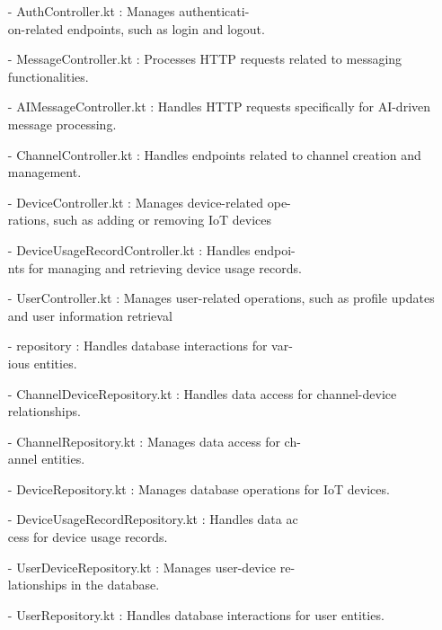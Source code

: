 \documentclass[conference]{IEEEtran}
\begin{document}
\begin{enumerate}
        \item[-] AuthController.kt : Manages authenticati-\\on-related endpoints, such as login and logout.\\
        
        \item[-] MessageController.kt : Processes HTTP requests related to messaging functionalities.\\
        
        \item[-] AIMessageController.kt : Handles HTTP requests specifically for AI-driven message processing.\\
        
        \item[-] ChannelController.kt : Handles endpoints related to channel creation and management.\\
        
        \item[-] DeviceController.kt : Manages device-related ope-\\rations, such as adding or removing IoT devices \\
        
        \item[-] DeviceUsageRecordController.kt : Handles endpoi-\\nts for managing and retrieving device usage records.\\
        
        \item[-] UserController.kt : Manages user-related operations, such as profile updates and user information retrieval\\

        \item[-] repository : Handles database interactions for var-\\ious entities.\\
        \item[-] ChannelDeviceRepository.kt : Handles data access for channel-device relationships.\\
        \item[-] ChannelRepository.kt : Manages data access for ch-\\annel entities.\\
        \item[-] DeviceRepository.kt : Manages database operations for IoT devices.\\
        \item[-] DeviceUsageRecordRepository.kt : Handles data ac\\cess for device usage records.\\
        \item[-] UserDeviceRepository.kt : Manages user-device re-\\lationships in the database.\\
        \item[-] UserRepository.kt : Handles database interactions for user entities.\\
        

\end{enumerate}
\end{document}
